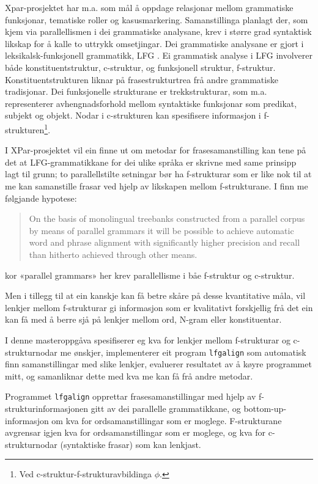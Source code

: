 \documentclass[11pt,a4paper,oneside,draft]{book}
\begin{document}
Xpar-prosjektet har m.a. som mål å oppdage relasjonar mellom
grammatiske funksjonar, tematiske roller og kasusmarkering.
Samanstillinga planlagt der, som kjem via parallellismen i dei
grammatiske analysane, krev i større grad syntaktisk likskap for å
kalle to uttrykk omsetjingar. Dei grammatiske analysane er gjort i
leksikalsk-funksjonell grammatikk, LFG \citep{bresnan2001lfs}. Ei
grammatisk analyse i LFG involverer både konstituentstruktur,
c-struktur, og funksjonell struktur, f-struktur. Konstituentstrukturen
liknar på frasestrukturtrea frå andre grammatiske tradisjonar. Dei
funksjonelle strukturane er trekkstrukturar, som m.a. representerer
avhengnadsforhold mellom syntaktiske funksjonar som predikat, subjekt
og objekt. Nodar i c-strukturen kan spesifisere informasjon i
f-strukturen\footnote{Ved c-struktur-f-strukturavbildinga $\phi$. }.

I XPar-prosjektet vil ein finne ut om metodar for frasesamanstilling
kan tene på det at LFG-grammatikkane for dei ulike språka er skrivne
med same prinsipp lagt til grunn; to parallellstilte setningar bør ha
f-strukturar som er like nok til at me kan samanstille frasar ved
hjelp av likskapen mellom f-strukturane. I \citet[s.~72]{dyvik2009lmp}
finn me følgjande hypotese:

\begin{quote}
On the basis of monolingual treebanks constructed from a parallel
corpus by means of parallel grammars it will be possible to achieve
automatic word and phrase alignment with significantly higher
precision and recall than hitherto achieved through other means.
\end{quote}

kor «parallel grammars» her krev parallellisme i båe f-struktur og
c-struktur.

Men i tillegg til at ein kanskje kan få betre skåre på desse
kvantitative måla, vil lenkjer mellom f-strukturar gi informasjon som
er kvalitativt forskjellig frå det ein kan få med å berre sjå på
lenkjer mellom ord, N-gram eller konstituentar.

I denne masteroppgåva spesifiserer eg kva for lenkjer mellom
f-strukturar og c-strukturnodar me ønskjer, implementerer eit program
\texttt{lfgalign} som automatisk finn samanstillingar med slike lenkjer,
evaluerer resultatet av å køyre programmet mitt, og samanliknar dette
med kva me kan få frå andre metodar.

Programmet \texttt{lfgalign} opprettar frasesamanstillingar med hjelp av
f-strukturinformasjonen gitt av dei parallelle grammatikkane, og
bottom-up-informasjon om kva for ordsamanstillingar som er
moglege. F-strukturane avgrensar igjen kva for ordsamanstillingar som
er moglege, og kva for c-strukturnodar (syntaktiske frasar) som kan
lenkjast.
\end{document}
